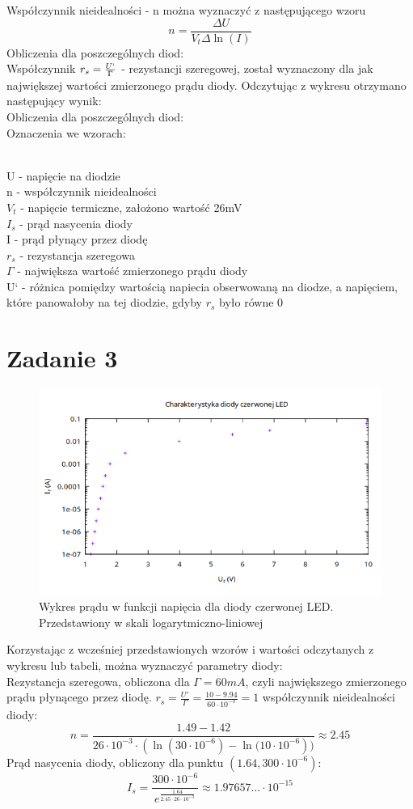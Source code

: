 \documentclass{article}
\begin{document}
Współczynnik nieidealności - n można wyznaczyć z następującego wzoru \[
  n = \frac{\Delta{U}}{V_t \Delta{\ln(I)}}
\]
Obliczenia dla poszczególnych diod: \\
Współczynnik $r_s=\frac{U`}{\Gamma}$ - rezystancji szeregowej, został wyznaczony dla jak największej wartości zmierzonego prądu diody. Odczytując z wykresu otrzymano następujący wynik:\\
Obliczenia dla poszczególnych diod: \\
Oznaczenia we wzorach:
\raggedright
\\ U - napięcie na diodzie\\ n - współczynnik nieidealności\\ $V_t$ - napięcie termiczne, założono wartość 26mV\\ 
$I_s$ - prąd nasycenia diody\\ I - prąd płynący przez diodę\\ $r_s$ - rezystancja szeregowa\\ $\Gamma$ - największa wartość zmierzonego prądu diody \\
U` - różnica pomiędzy wartością napiecia obserwowaną na diodze, a napięciem, które panowałoby na tej diodzie, gdyby $r_s$ było równe 0\\
\break
\raggedright
\section{Zadanie 3}
\centering
\begin{figure}[h]
  \includegraphics[scale=0.5]{./img/Z3_U.png}
  \caption{Wykres prądu w funkcji napięcia dla diody czerwonej LED. Przedstawiony w skali logarytmiczno-liniowej}
\end{figure}
Korzystając z wcześniej przedstawionych wzorów i wartości odczytanych z wykresu lub tabeli, można wyznaczyć parametry diody: \\
Rezystancja szeregowa, obliczona dla $\Gamma=60mA$, czyli największego zmierzonego prądu płynącego przez diodę.  $r_s=\frac{U'}{\Gamma} = \frac{10-9.94}{60 \cdot 10^{-3}}=1$
współczynnik nieidealności diody: \[n = \frac{1.49-1.42}
{26 \cdot 10^{-3} \cdot (\ln{(30 \cdot 10^{-6})}-\ln{(10 \cdot 10^{-6}}))} \approx 2.45\]
Prąd nasycenia diody, obliczony dla punktu $(1.64,300\cdot10^{-6})$: \[I_s=\frac{300 \cdot 10^{-6}}{e^{\frac{1.64}{2.45 \cdot 26 \cdot 10^{-3}}}} \approx 1.97657... \cdot 10^{-15}\]
\break
\raggedright
\end{document}
